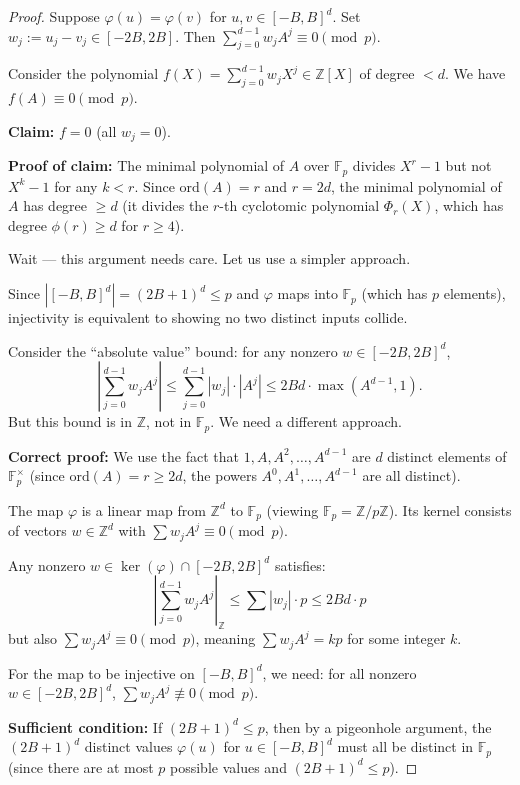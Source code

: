\documentclass[11pt]{article}
\newcommand{\Fp}{\mathbb{F}_p}
\newcommand{\ord}{\mathrm{ord}}
\begin{document}
\begin{proof}
Suppose $\varphi(u) = \varphi(v)$ for $u,v \in [-B,B]^d$. Set $w_j := u_j - v_j \in [-2B, 2B]$.
Then $\sum_{j=0}^{d-1} w_j A^j \equiv 0 \pmod{p}$.

Consider the polynomial $f(X) = \sum_{j=0}^{d-1} w_j X^j \in \mathbb{Z}[X]$ of degree $< d$.
We have $f(A) \equiv 0 \pmod{p}$.

\textbf{Claim:} $f = 0$ (all $w_j = 0$).

\textbf{Proof of claim:} The minimal polynomial of $A$ over $\Fp$ divides $X^r - 1$ but not $X^k - 1$ for any $k < r$. Since $\ord(A) = r$ and $r = 2d$, the minimal polynomial of $A$ has degree $\geq d$ (it divides the $r$-th cyclotomic polynomial $\Phi_r(X)$, which has degree $\phi(r) \geq d$ for $r \geq 4$).

Wait --- this argument needs care. Let us use a simpler approach.

Since $|[-B,B]^d| = (2B+1)^d \leq p$ and $\varphi$ maps into $\Fp$ (which has $p$ elements), injectivity is equivalent to showing no two distinct inputs collide.

Consider the ``absolute value'' bound: for any nonzero $w \in [-2B,2B]^d$,
\[
\left| \sum_{j=0}^{d-1} w_j A^j \right| \leq \sum_{j=0}^{d-1} |w_j| \cdot |A^j| \leq 2Bd \cdot \max(A^{d-1}, 1).
\]
But this bound is in $\mathbb{Z}$, not in $\Fp$. We need a different approach.

\textbf{Correct proof:} We use the fact that $1, A, A^2, \ldots, A^{d-1}$ are $d$ distinct elements of $\Fp^\times$ (since $\ord(A) = r \geq 2d$, the powers $A^0, A^1, \ldots, A^{d-1}$ are all distinct).

The map $\varphi$ is a linear map from $\mathbb{Z}^d$ to $\Fp$ (viewing $\Fp = \mathbb{Z}/p\mathbb{Z}$). Its kernel consists of vectors $w \in \mathbb{Z}^d$ with $\sum w_j A^j \equiv 0 \pmod{p}$.

Any nonzero $w \in \ker(\varphi) \cap [-2B,2B]^d$ satisfies:
\[
\left| \sum_{j=0}^{d-1} w_j A^j \right|_{\mathbb{Z}} \leq \sum |w_j| \cdot p \leq 2Bd \cdot p
\]
but also $\sum w_j A^j \equiv 0 \pmod{p}$, meaning $\sum w_j A^j = kp$ for some integer $k$.

For the map to be injective on $[-B,B]^d$, we need: for all nonzero $w \in [-2B,2B]^d$, $\sum w_j A^j \not\equiv 0 \pmod{p}$.

\textbf{Sufficient condition:} If $(2B+1)^d \leq p$, then by a pigeonhole argument, the $(2B+1)^d$ distinct values $\varphi(u)$ for $u \in [-B,B]^d$ must all be distinct in $\Fp$ (since there are at most $p$ possible values and $(2B+1)^d \leq p$).


\end{proof}
\end{document}

